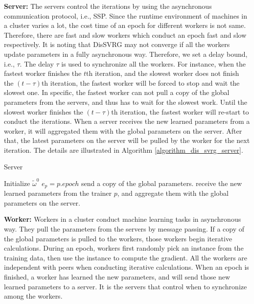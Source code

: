 \documentclass[10pt,journal,finalsubmission,compsoc]{IEEEtran}
\begin{document}
\textbf{Server:}    The servers control the iterations by using the asynchronous communication protocol, i.e., SSP.  Since the runtime environment of machines in a cluster varies a lot, the cost time of an epoch for different workers  is not same. Therefore, there are fast and slow workers which conduct an epoch fast and slow respectively.   It is noting that DisSVRG may not converge if all the workers update parameters in a fully asynchronous way. Therefore, we set a delay bound, i.e., $\tau$. The delay $\tau$ is used to synchronize all the workers. For instance, when the fastest worker finishes the $t$th iteration, and the slowest worker does not finish the $(t-\tau)$th iteration, the fastest worker will be forced to stop and wait the slowest one. In specific, the fastest worker can not  pull a copy of the global parameters from the servers, and thus has to wait for the slowest work. Until the slowest worker finishes the $(t-\tau)$th iteration, the fastest worker will re-start to conduct the iterations. When a server receives the new learned parameters from a worker, it will aggregated them with the global parameters on the server. After that, the latest parameters on the server will be pulled by the worker for the next iteration.
The details are illustrated in Algorithm \ref{algorithm_dis_svrg_server}.

\begin{algorithm}[t]
    \caption{Server}
    \label{algorithm_dis_svrg_server}
    \begin{algorithmic}[1]
        \State Initialize $\tilde{\omega}^0$
               \State $e_p=p.epoch$
                    \State send a copy of the global parameters.
                \EndIf
            \EndIf
                \State receive the new learned parameters from the trainer $p$, and aggregate them with the global parameters on the server.
            \EndIf
        \EndWhile
    \end{algorithmic}
\end{algorithm}

\textbf{Worker:} Workers in a cluster conduct machine learning tasks in asynchronous way. They pull the parameters from the servers by message passing. If a  copy of the global parameters is pulled to the workers, those workers begin iterative calculations. During an epoch, workers first randomly pick an instance from the training data, then use the instance to compute the gradient.  All the workers are independent with peers when conducting iterative calculations. When an epoch is finished, a worker has learned the new parameters, and will send those new learned parameters to a server. It is the servers that control when to synchronize among the workers. 
 
\end{document}

